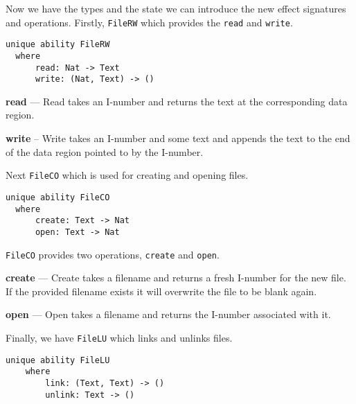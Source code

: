 \documentclass[logo,bsc,singlespacing,parskip]{infthesis}
\begin{document}
Now we have the types and the state we can introduce the new effect signatures
and operations. Firstly, \texttt{FileRW} which provides the \texttt{read} and
\texttt{write}.

\begin{lstlisting}[language=unison]
unique ability FileRW
  where
      read: Nat -> Text
      write: (Nat, Text) -> ()
\end{lstlisting}

\textbf{read} --- Read takes an I-number and returns the text at the corresponding data region.

\textbf{write} -- Write takes an I-number and some text and appends the text to
the end of the data region pointed to by the I-number.

Next \texttt{FileCO} which is used for creating and opening files.
\begin{lstlisting}[language=unison]
unique ability FileCO
  where
      create: Text -> Nat
      open: Text -> Nat
\end{lstlisting}
\texttt{FileCO} provides two operations, \texttt{create} and \texttt{open}.

\textbf{create} --- Create takes a filename and returns a fresh I-number for
the new file. If the provided filename exists it will overwrite the file to be
blank again.

\textbf{open} --- Open takes a filename and returns the I-number associated with it.

Finally, we have \texttt{FileLU} which links and unlinks files.

\begin{lstlisting}[language=unison]
unique ability FileLU
    where
        link: (Text, Text) -> ()
        unlink: Text -> ()
\end{lstlisting}
\end{document}

